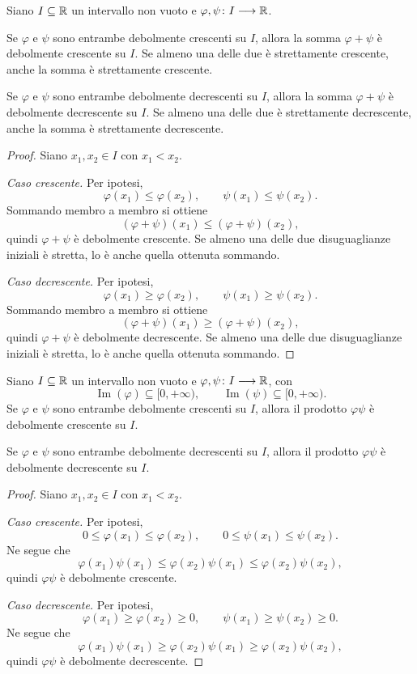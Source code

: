 \begin{proposition}
\label{prop:lez10-monotonia-somma}
Siano \(I\subseteq\mathbb{R}\) un intervallo non vuoto e
\(\varphi,\psi\colon I\longrightarrow\mathbb{R}\).

Se \(\varphi\) e \(\psi\) sono entrambe debolmente crescenti
su \(I\), allora la somma \(\varphi+\psi\) è debolmente
crescente su \(I\). Se almeno una delle due è strettamente
crescente, anche la somma è strettamente crescente.

Se \(\varphi\) e \(\psi\) sono entrambe debolmente decrescenti
su \(I\), allora la somma \(\varphi+\psi\) è debolmente
decrescente su \(I\). Se almeno una delle due è strettamente
decrescente, anche la somma è strettamente decrescente.
\end{proposition}

\begin{proof}
Siano \(x_1,x_2\in I\) con \(x_1<x_2\).

\emph{Caso crescente.}
Per ipotesi,
\[
  \varphi(x_1)\le\varphi(x_2),
  \qquad \psi(x_1)\le\psi(x_2).
\]
Sommando membro a membro si ottiene
\[
  (\varphi+\psi)(x_1)\le(\varphi+\psi)(x_2),
\]
quindi \(\varphi+\psi\) è debolmente crescente.
Se almeno una delle due disuguaglianze iniziali è
stretta, lo è anche quella ottenuta sommando.

\emph{Caso decrescente.}
Per ipotesi,
\[
  \varphi(x_1)\ge\varphi(x_2),
  \qquad \psi(x_1)\ge\psi(x_2).
\]
Sommando membro a membro si ottiene
\[
  (\varphi+\psi)(x_1)\ge(\varphi+\psi)(x_2),
\]
quindi \(\varphi+\psi\) è debolmente decrescente.
Se almeno una delle due disuguaglianze iniziali è
stretta, lo è anche quella ottenuta sommando.
\end{proof}

\begin{proposition}
\label{prop:lez10-monotonia-prodotto}
Siano \(I\subseteq\mathbb{R}\) un intervallo non vuoto e
\(\varphi,\psi\colon I\longrightarrow\mathbb{R}\), con
\[
  \operatorname{Im}(\varphi)\subseteq[0,+\infty),
  \qquad
  \operatorname{Im}(\psi)\subseteq[0,+\infty).
\]
Se \(\varphi\) e \(\psi\) sono entrambe debolmente crescenti
su \(I\), allora il prodotto \(\varphi\psi\) è debolmente
crescente su \(I\).

Se \(\varphi\) e \(\psi\) sono entrambe debolmente decrescenti
su \(I\), allora il prodotto \(\varphi\psi\) è debolmente
decrescente su \(I\).
\end{proposition}

\begin{proof}
Siano \(x_1,x_2\in I\) con \(x_1<x_2\).

\emph{Caso crescente.}
Per ipotesi,
\[
  0\le\varphi(x_1)\le\varphi(x_2),
  \qquad 0\le\psi(x_1)\le\psi(x_2).
\]
Ne segue che
\[
  \varphi(x_1)\psi(x_1)
  \le\varphi(x_2)\psi(x_1)
  \le\varphi(x_2)\psi(x_2),
\]
quindi \(\varphi\psi\) è debolmente crescente.

\emph{Caso decrescente.}
Per ipotesi,
\[
  \varphi(x_1)\ge\varphi(x_2)\ge0,
  \qquad \psi(x_1)\ge\psi(x_2)\ge0.
\]
Ne segue che
\[
  \varphi(x_1)\psi(x_1)
  \ge\varphi(x_2)\psi(x_1)
  \ge\varphi(x_2)\psi(x_2),
\]
quindi \(\varphi\psi\) è debolmente decrescente.
\end{proof}


